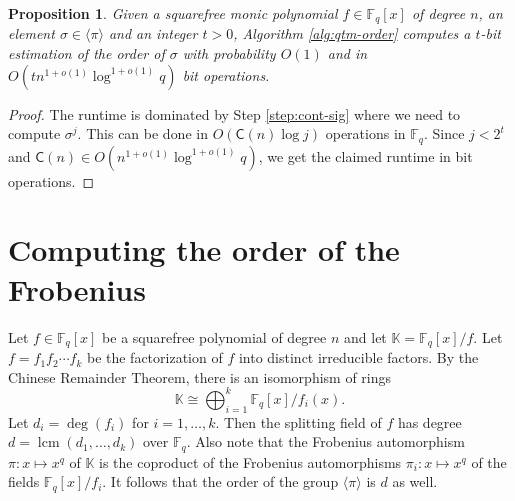 \documentclass[12pt]{article}
\theoremstyle{plain}
\newtheorem{proposition}[theorem]{Proposition}
\theoremstyle{definition}
\newcommand{\lrang}[1]{\langle#1\rangle}
\DeclareMathOperator{\lcm}{lcm} %
\def\K{\ensuremath{\mathbb{K}}}
\def\F{\ensuremath{\mathbb{F}}}
\def\CC{\ensuremath{\mathsf{C}}}
\begin{document}
\begin{proposition}
	Given a squarefree monic polynomial $f \in \F_q[x]$ of degree $n$, an element $\sigma \in 
	\lrang{\pi}$ and an integer $t > 0$, Algorithm \ref{alg:qtm-order} computes a $t$-bit 
	estimation of the order of $\sigma$ with probability $O(1)$ and in $O(tn^{1 + o(1)}\log^{1 + 
	o(1)}q)$ bit operations.
\end{proposition}
\begin{proof}
	The runtime is dominated by Step \ref{step:cont-sig} where we need to compute $\sigma^j$. This 
	can be done in $O(\CC(n)\log j)$ operations in $\F_q$. Since $j < 2^t$ and $\CC(n) \in O(n^{1 + 
	o(1)}\log^{1 + o(1)}q)$, we get the claimed runtime in bit operations.
\end{proof}



\section{Computing the order of the Frobenius}

Let $f \in \F_q[x]$ be a squarefree polynomial of degree $n$ and let $\K = \F_q[x] / f$. Let $f = 
f_1f_2 \cdots f_k$ be the factorization of $f$ into distinct irreducible factors. By the Chinese 
Remainder Theorem, there is an isomorphism of rings
\begin{equation}
\label{equ:crt}
	\K \cong \bigoplus_{i = 1}^k \F_q[x] / f_i(x).
\end{equation}
Let $d_i = \deg(f_i)$ for $i = 1, \dots, k$. Then the splitting field of $f$ has degree $d = 
\lcm(d_1, \dots, d_k)$ over $\F_q$. Also note that the Frobenius automorphism $\pi: x \mapsto x^q$ 
of $\K$ is the coproduct of the Frobenius automorphisms $\pi_i: x \mapsto x^q$ of the fields 
$\F_q[x] / f_i$. It follows that the order of the group $\lrang{\pi}$ is $d$ as well.
\end{document}
